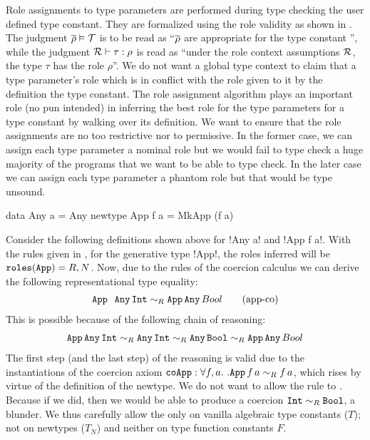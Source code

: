 \documentclass[screen,nonacm,manuscript,review]{acmart} %
\begin{document}
Role assignments to type parameters are performed during type checking the user defined type constant. They are formalized using the role validity as shown in . The judgment $\overline{\rho} \mathrel{\vDash} \mathcal{T}$ is to be read as ``$\overline{\rho}$ are appropriate for the type constant \TypeConst'', while the judgment $\mathcal{R} \vdash \tau : \rho$ is read as ``under the role context assumptions $\mathcal{R}$, the type $\tau$ has the role $\rho$''. We do not want a global type context to claim that a type parameter's role which is in conflict with the role given to it by the definition the type constant. The role assignment algorithm plays an important role (no pun intended) in inferring the best role for the type parameters for a type constant by walking over its definition. We want to ensure that the role assignments are no too restrictive nor to permissive. In the former case, we can assign each type parameter a nominal role but we would fail to type check a huge majority of the programs that we want to be able to type check. In the later case we can assign each type parameter a phantom role but that would be type unsound.

\begin{CenteredBox}
  \begin{code}
    data Any a = Any
    newtype App f a = MkApp (f a)
  \end{code}
\end{CenteredBox}
Consider the following definitions shown above for !Any a! and !App f a!. With the rules given in , for the generative type !App!, the roles inferred will be $\texttt{roles}(\texttt{App}) = R, N$. Now, due to the rules of the coercion calculus we can derive the following representational type equality:
\begin{align}\label{eqn:app-any-newtype}
  \texttt{App } \, \texttt{Any}\, \texttt{Int} \mathrel{\sim_R} \texttt{App}\,\texttt{Any} \,{Bool}\tag{app-co}
\end{align}
This is possible because of the following chain of reasoning:
\begin{align}
  \texttt{App} \App \texttt{Any}\App \texttt{Int}%
  \teqR \texttt{Any}\App \texttt{Int}%
  \teqR \texttt{Any}\App \texttt{Bool}%
  \teqR \texttt{App}\App\texttt{Any} \App{Bool}\nonumber
\end{align}
The first step (and the last step) of the reasoning is valid due to the instantiations of the coercion axiom $\texttt{coApp} : \forall f, a.~. \texttt{App}\, f\, a \mathrel{\sim_R} f\, a$, which rises by virtue of the definition of the newtype. We do not want to allow the rule  to . Because if we did, then we would be able to produce a coercion $\texttt{Int} \mathrel{\sim_R} \texttt{Bool}$, a blunder. We thus carefully allow the  only on vanilla algebraic type constants ($T$); not on newtypes ($T_N$) and neither on type function constants $F$.
\end{document}
